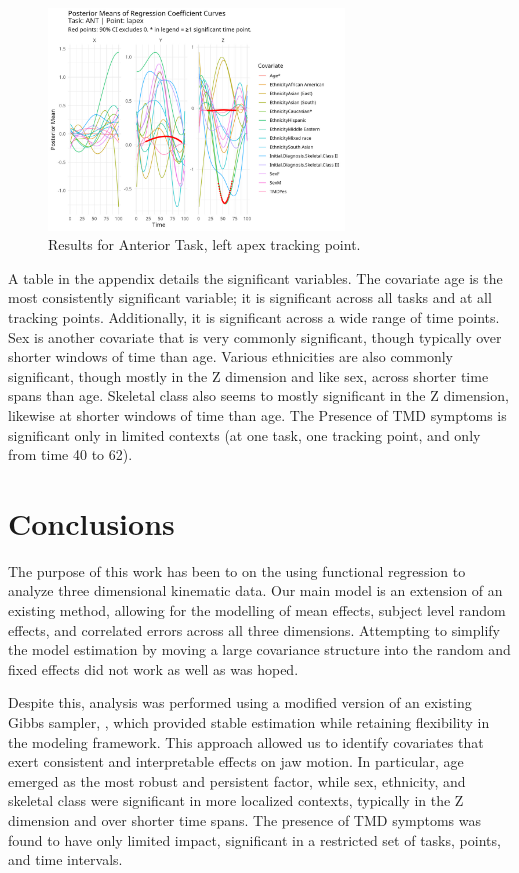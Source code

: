 \documentclass[AMA,Times1COL]{WileyNJDv5} %
\begin{document}
\begin{figure}[h]
    \centering
    \includegraphics[width = 0.7\textwidth]{ant_lapex_plot.jpeg}
    \caption{Results for Anterior Task, left apex tracking point.}
    \label{fig:ant_lapex}
\end{figure}

A table in the appendix details the significant variables.  The covariate age is the most consistently significant variable; it is significant across all tasks and at all tracking points.  Additionally, it is significant across a wide range of time points.  Sex is another covariate that is very commonly significant, though typically over shorter windows of time than age.  Various ethnicities are also commonly significant, though mostly in the Z dimension and like sex, across shorter time spans than age.  Skeletal class also seems to mostly significant in the Z dimension, likewise at shorter windows of time than age.  The Presence of TMD symptoms is significant only in limited contexts (at one task, one tracking point, and only from time 40 to 62).  

\section{Conclusions}\label{sec5}
The purpose of this work has been to on the using functional regression to analyze three dimensional kinematic data.  Our main model is an extension of an existing method, allowing for the modelling of mean effects, subject level random effects, and correlated errors across all three dimensions.  Attempting to simplify the model estimation by moving a large covariance structure into the random and fixed effects did not work as well as was hoped.  

Despite this, analysis was performed using a modified version of an existing Gibbs sampler, , which provided stable estimation while retaining flexibility in the modeling framework. This approach allowed us to identify covariates that exert consistent and interpretable effects on jaw motion.  In particular, age emerged as the most robust and persistent factor, while sex, ethnicity, and skeletal class were significant in more localized contexts, typically in the Z dimension and over shorter time spans. The presence of TMD symptoms was found to have only limited impact, significant in a restricted set of tasks, points, and time intervals.
\end{document}
